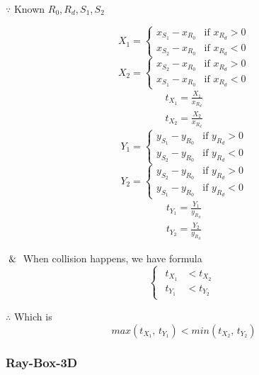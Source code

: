 $\because$ Known $R_0$,\,$R_d$,\,$S_1$,\,$S_2$
\begin{multicols}{2}
\noindent
\[
X_1 =
\begin{cases}
x_{S_1} - x_{R_0} & \text{if } x_{R_d} > 0 \\
x_{S_2} - x_{R_0} & \text{if } x_{R_d} < 0
\end{cases}
\]
\[
X_2 =
\begin{cases}
x_{S_2} - x_{R_0} & \text{if } x_{R_d} > 0 \\
x_{S_1} - x_{R_0} & \text{if } x_{R_d} < 0
\end{cases}
\]
\[
\begin{array}{lr}
t_{X_1} = \frac{X_1}{x_{R_d}} \\
t_{X_2} = \frac{X_2}{x_{R_d}}
\end{array}
\]
\columnbreak
\[
Y_1 =
\begin{cases}
y_{S_1} - y_{R_0} & \text{if } y_{R_d} > 0 \\
y_{S_2} - y_{R_0} & \text{if } y_{R_d} < 0
\end{cases}
\]
\[
Y_2 =
\begin{cases}
y_{S_2} - y_{R_0} & \text{if } y_{R_d} > 0 \\
y_{S_1} - y_{R_0} & \text{if } y_{R_d} < 0
\end{cases}
\]
\[
\begin{array}{lr}
t_{Y_1} = \frac{Y_1}{y_{R_d}} \\
t_{Y_2} = \frac{Y_2}{y_{R_d}}
\end{array}
\]
\end{multicols}

$\And$ When collision happens,  we have formula
\[
\left\{
\begin{array}{lr}
\begin{aligned}
t_{X_1} &< t_{X_2} \\
t_{Y_1} &< t_{Y_2}
\end{aligned}
\end{array}
\right.
\]

$\therefore$ Which is
\begin{equation}\label{equ:ray-box-2d-intersection}
max(t_{X_1},\,t_{Y_1}) < min(t_{X_2},\,t_{Y_2})
\end{equation}

\subsubsection{Ray-Box-3D}

